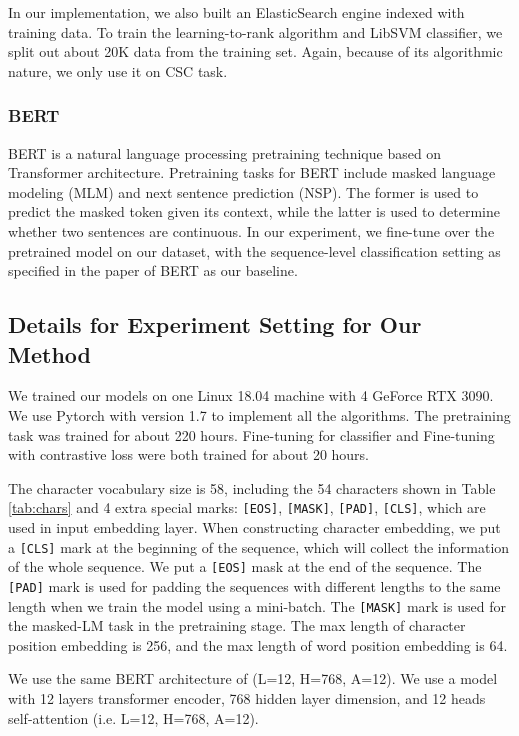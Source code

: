\documentclass{article}
\begin{document}
In our implementation, we also built an ElasticSearch engine indexed with training data. To train the learning-to-rank algorithm and LibSVM classifier, we split out about 20K data from the training set. Again, because of its algorithmic nature, we only use it on CSC task.



\subsubsection{BERT}
BERT \cite{DBLP:conf/naacl/DevlinCLT19} is a natural language processing pretraining technique based on Transformer architecture. Pretraining tasks for BERT include masked language modeling (MLM) and next sentence prediction (NSP). The former is used to predict the masked token given its context, while the latter is used to determine whether two sentences are continuous.
In our experiment, we fine-tune over the pretrained  model on our dataset, with the sequence-level classification setting as specified in the paper of BERT as our baseline.



\subsection{Details for Experiment Setting for Our Method}

We trained our models on one Linux 18.04 machine with 4 GeForce RTX 3090. We use Pytorch with version 1.7 to implement all the algorithms. The pretraining task was trained for about 220 hours. Fine-tuning for classifier and Fine-tuning with contrastive loss were both trained for about 20 hours.

The character vocabulary size is 58, including the 54 characters shown in Table \ref{tab:chars} and 4 extra special marks: \texttt{[EOS]}, \texttt{[MASK]}, \texttt{[PAD]}, \texttt{[CLS]}, which are used in input embedding layer. When constructing character embedding, we put a \texttt{[CLS]} mark at the beginning of the sequence, which will collect the information of the whole sequence. We put a \texttt{[EOS]} mask at the end of the sequence. The \texttt{[PAD]} mark is used for padding the sequences with different lengths to the same length when we train the model using a mini-batch. The \texttt{[MASK]} mark is used for the masked-LM task in the pretraining stage. The max length of character position embedding is 256, and the max length of word position embedding is 64.

We use the same BERT architecture of  (L=12, H=768, A=12). We use a model with 12 layers transformer encoder, 768 hidden layer dimension, and 12 heads self-attention (i.e. L=12, H=768, A=12).
\end{document}

